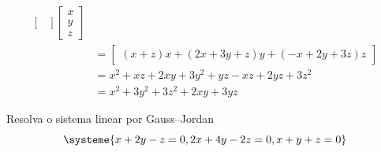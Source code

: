 \documentclass[a4paper,12pt,fleqn]{article}
\begin{document}
\begin{answer}
\begin{align*}
\begin{bmatrix}
    \end{bmatrix}
    \begin{bmatrix}
      x \\ y \\ z
    \end{bmatrix}
    \\[2mm]
    & =
    \begin{bmatrix}
      (x + z)x +
      (2x + 3y + z)y +
      (-x + 2y + 3z)z
    \end{bmatrix}
    \\[2mm]
    & =
      x^2 + xz
      + 2xy + 3y^2 + yz
      - xz + 2yz + 3z^2
    \\[2mm]
    & =
      x^2 + 3y^2 + 3z^2 + 2xy + 3yz
  \end{align*}
\end{answer}

Resolva o sistema linear por Gauss--Jordan
\[
  \systeme{
     x + 2y -  z = 0,
    2x + 4y - 2z = 0,
     x +  y +  z = 0
  }
\]
\end{document}
